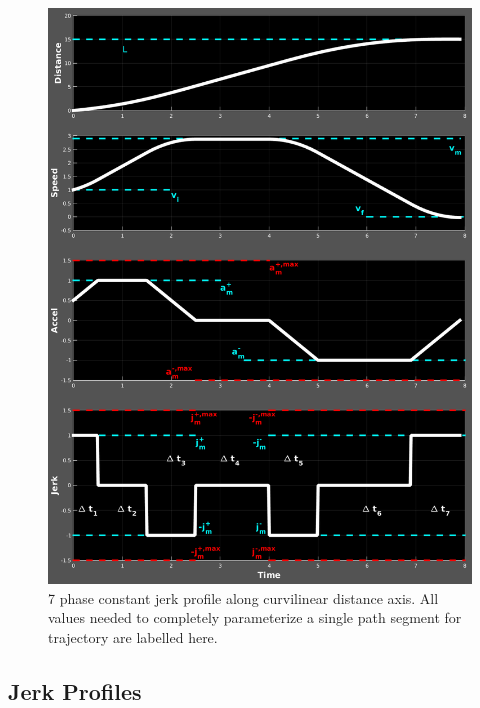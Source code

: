 \documentclass[letterpaper, 10 pt, conference]{ieeeconf}  %
\begin{document}
\begin{figure}[thpb]
  \centering
  \includegraphics[width=1.0\columnwidth]{graphics/Full7PhaseSpecVertical.png}
  \caption{
    7 phase constant jerk profile along curvilinear distance axis.
    All values needed to completely parameterize a single path segment for trajectory are labelled here.}
  \label{fig:full7phasespec}
\end{figure}


\subsection{Jerk Profiles} \label{sec:jerkprofiles}
\end{document}
